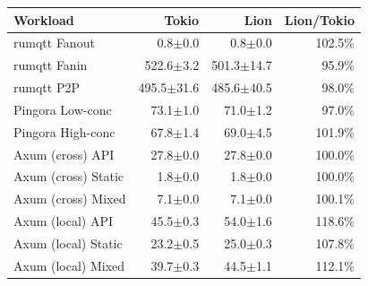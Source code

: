 \begin{tabular}{@{}l r r r@{}}
\toprule
Workload & Tokio & Lion & Lion/Tokio \\
\midrule
rumqtt Fanout & 0.8$\pm$0.0 & 0.8$\pm$0.0 & 102.5\% \\
rumqtt Fanin & 522.6$\pm$3.2 & 501.3$\pm$14.7 & 95.9\% \\
rumqtt P2P & 495.5$\pm$31.6 & 485.6$\pm$40.5 & 98.0\% \\
Pingora Low-conc & 73.1$\pm$1.0 & 71.0$\pm$1.2 & 97.0\% \\
Pingora High-conc & 67.8$\pm$1.4 & 69.0$\pm$4.5 & 101.9\% \\
Axum (cross) API & 27.8$\pm$0.0 & 27.8$\pm$0.0 & 100.0\% \\
Axum (cross) Static & 1.8$\pm$0.0 & 1.8$\pm$0.0 & 100.0\% \\
Axum (cross) Mixed & 7.1$\pm$0.0 & 7.1$\pm$0.0 & 100.1\% \\
Axum (local) API & 45.5$\pm$0.3 & 54.0$\pm$1.6 & 118.6\% \\
Axum (local) Static & 23.2$\pm$0.5 & 25.0$\pm$0.3 & 107.8\% \\
Axum (local) Mixed & 39.7$\pm$0.3 & 44.5$\pm$1.1 & 112.1\% \\
\bottomrule
\end{tabular}
